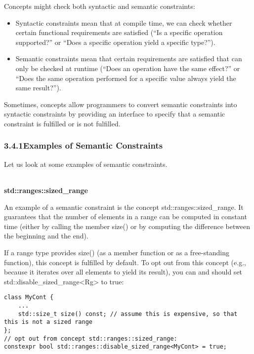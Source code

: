 
Concepts might check both syntactic and semantic constraints:

\begin{itemize}
\item
Syntactic constraints mean that at compile time, we can check whether certain functional requirements are satisfied (“Is a specific operation supported?” or “Does a specific operation yield a specific type?”).

\item
Semantic constraints mean that certain requirements are satisfied that can only be checked at runtime (“Does an operation have the same effect?” or “Does the same operation performed for a specific value always yield the same result?”).
\end{itemize}

Sometimes, concepts allow programmers to convert semantic constraints into syntactic constraints by providing an interface to specify that a semantic constraint is fulfilled or is not fulfilled.

\subsubsection*{ 3.4.1\hspace{0.2cm}Examples of Semantic Constraints}

Let us look at some examples of semantic constraints.

\noindent
\hspace*{\fill} \\ %
\textbf{std::ranges::sized\_range}

An example of a semantic constraint is the concept std::ranges::sized\_range. It guarantees that the number of elements in a range can be computed in constant time (either by calling the member size() or by computing the difference between the beginning and the end).

If a range type provides size() (as a member function or as a free-standing function), this concept is fulfilled by default. To opt out from this concept (e.g., because it iterates over all elements to yield its result), you can and should set std::disable\_sized\_range<Rg> to true:

\begin{lstlisting}[style=styleCXX]
class MyCont {
	...
	std::size_t size() const; // assume this is expensive, so that this is not a sized range
};
// opt out from concept std::ranges::sized_range:
constexpr bool std::ranges::disable_sized_range<MyCont> = true;
\end{lstlisting}

